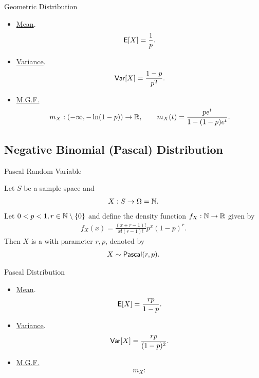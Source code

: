 \begin{frame}{Geometric Distribution}

\justifying
{} 
\begin{itemize}
	\justifying
	\item \underline{Mean}.
	\begin{align*}
	\mathsf{E}[X] = \frac{1}{p}.
	\end{align*}
	\item \underline{Variance}.
	\begin{align*}
	\mathsf{Var}[X] = \frac{1-p}{p^2}.
	\end{align*}
	\item \underline{M.G.F.}
	\begin{align*}
	m_X: (-\infty, -\ln(1-p)) \rightarrow\mathbb{R}, \qquad m_X(t) = \frac{pe^t}{1-(1-p)e^t}.
	\end{align*}
\end{itemize}

\end{frame}

\subsection{Negative Binomial (Pascal) Distribution}

\begin{frame}{Pascal Random Variable}

\justifying
{} Let $S$ be a sample space and
\begin{align*}
X: S\rightarrow \Omega = \mathbb{N}.
\end{align*}
Let $0 < p < 1, r\in \mathbb{N}\setminus \{0\}$ and define the density function $f_X: \mathbb{N} \rightarrow \mathbb{R}$ given by
\begin{align*}
f_X(x) = \frac{(x+r-1)!}{x!(r-1)!} p^x(1-p)^r.
\end{align*}
Then $X$ is a  with parameter $r, p$, denoted by
\begin{align*}
X\sim \mathsf{Pascal}(r, p).
\end{align*}

\end{frame}

\begin{frame}{Pascal Distribution}

\justifying
{} 
\begin{itemize}
	\justifying
	\item \underline{Mean}.
	\begin{align*}
	\mathsf{E}[X] = \frac{rp}{1-p}.
	\end{align*}
	\item \underline{Variance}.
	\begin{align*}
	\mathsf{Var}[X] = \frac{rp}{(1-p)^2}.
	\end{align*}
	\item \underline{M.G.F.}
	\begin{align*}
	m_X: 
	\end{align*}
\end{itemize}

\end{frame}

